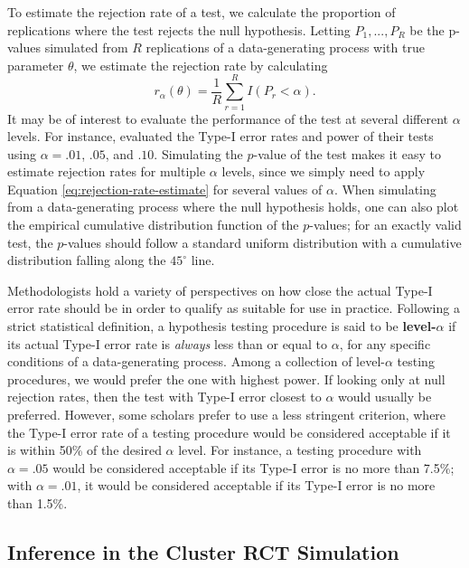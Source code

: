\documentclass[
]{book}
\begin{document}
To estimate the rejection rate of a test, we calculate the proportion of replications where the test rejects the null hypothesis.
Letting \(P_1,...,P_R\) be the p-values simulated from \(R\) replications of a data-generating process with true parameter \(\theta\), we estimate the rejection rate by calculating
\[
r_\alpha(\theta) = \frac{1}{R} \sum_{r=1}^R I(P_r < \alpha).
\label{eq:rejection-rate-estimate}
\]
It may be of interest to evaluate the performance of the test at several different \(\alpha\) levels.
For instance, \citet{brown1974SmallSampleBehavior} evaluated the Type-I error rates and power of their tests using \(\alpha = .01\), \(.05\), and \(.10\).
Simulating the \(p\)-value of the test makes it easy to estimate rejection rates for multiple \(\alpha\) levels, since we simply need to apply Equation \eqref{eq:rejection-rate-estimate} for several values of \(\alpha\).
When simulating from a data-generating process where the null hypothesis holds, one can also plot the empirical cumulative distribution function of the \(p\)-values; for an exactly valid test, the \(p\)-values should follow a standard uniform distribution with a cumulative distribution falling along the \(45^\circ\) line.

Methodologists hold a variety of perspectives on how close the actual Type-I error rate should be in order to qualify as suitable for use in practice. Following a strict statistical definition, a hypothesis testing procedure is said to be \textbf{level-\(\alpha\)} if its actual Type-I error rate is \emph{always} less than or equal to \(\alpha\), for any specific conditions of a data-generating process.
Among a collection of level-\(\alpha\) testing procedures, we would prefer the one with highest power.
If looking only at null rejection rates, then the test with Type-I error closest to \(\alpha\) would usually be preferred.
However, some scholars prefer to use a less stringent criterion, where the Type-I error rate of a testing procedure would be considered acceptable if it is within 50\% of the desired \(\alpha\) level.
For instance, a testing procedure with \(\alpha = .05\) would be considered acceptable if its Type-I error is no more than 7.5\%; with \(\alpha = .01\), it would be considered acceptable if its Type-I error is no more than 1.5\%.

\subsection{Inference in the Cluster RCT Simulation}\label{inference-in-the-cluster-rct-simulation}
\end{document}
